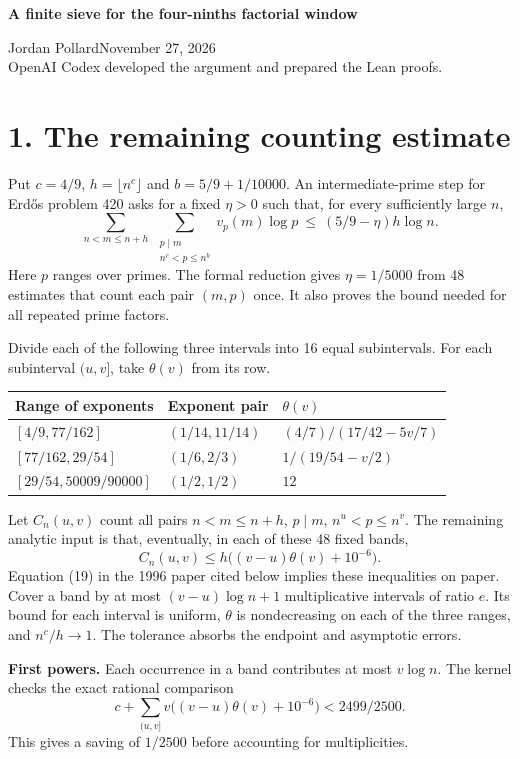 \documentclass[10pt]{article}
\newcommand{\thetar}{\theta}
\begin{document}
{\LARGE\bfseries A finite sieve for the four-ninths factorial window\par}
\smallskip
Jordan Pollard\hfill November 27, 2026\\
{\small OpenAI Codex developed the argument and prepared the Lean proofs.}

\section*{1. The remaining counting estimate}
Put $c=4/9$, $h=\lfloor n^c\rfloor$ and $b=5/9+1/10000$. An intermediate-prime step for Erd\H{o}s problem 420 asks for a fixed $\eta>0$ such that, for every sufficiently large $n$,
\[
  \sum_{n<m\le n+h}\ \sum_{\substack{p\mid m\\n^c<p\le n^b}} v_p(m)\log p
  \ \le\ (5/9-\eta)h\log n .
\]
Here $p$ ranges over primes. The formal reduction gives $\eta=1/5000$ from 48 estimates that count each pair $(m,p)$ once. It also proves the bound needed for all repeated prime factors.

Divide each of the following three intervals into 16 equal subintervals. For each subinterval $(u,v]$, take $\thetar(v)$ from its row.
\begin{center}
\begin{tabular}{lll}
\toprule
Range of exponents & Exponent pair & $\thetar(v)$ \\
\midrule
$[4/9,77/162]$ & $(1/14,11/14)$ & $(4/7)/(17/42-5v/7)$ \\
$[77/162,29/54]$ & $(1/6,2/3)$ & $1/(19/54-v/2)$ \\
$[29/54,50009/90000]$ & $(1/2,1/2)$ & $12$ \\
\bottomrule
\end{tabular}
\end{center}
Let $C_n(u,v)$ count all pairs $n<m\le n+h$, $p\mid m$, $n^u<p\le n^v$. The remaining analytic input is that, eventually, in each of these 48 fixed bands,
\[
 C_n(u,v)\le h\big((v-u)\thetar(v)+10^{-6}\big).
\]
Equation (19) in the 1996 paper cited below implies these inequalities on paper. Cover a band by at most $(v-u)\log n+1$ multiplicative intervals of ratio $e$. Its bound for each interval is uniform, $\theta$ is nondecreasing on each of the three ranges, and $n^c/h\to1$. The tolerance absorbs the endpoint and asymptotic errors.

\textbf{First powers.} Each occurrence in a band contributes at most $v\log n$. The kernel checks the exact rational comparison
\[
 c+\sum_{(u,v]}v\big((v-u)\thetar(v)+10^{-6}\big)<2499/2500 .
\]
This gives a saving of $1/2500$ before accounting for multiplicities.
\end{document}
